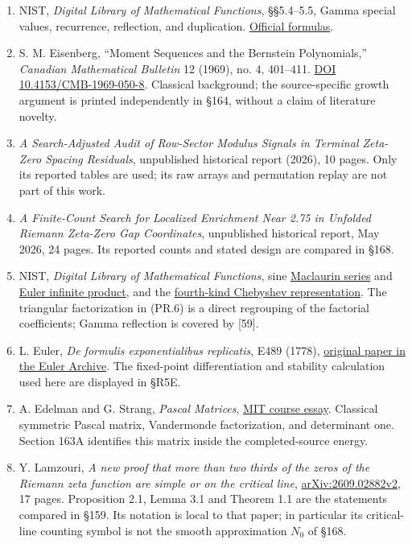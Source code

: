 \documentclass[
  11pt,
]{book}
\begin{document}
\begin{enumerate}
  765--773, \href{https://doi.org/10.2307/2153215}{DOI 10.2307/2153215}.
\item
  NIST, \emph{Digital Library of Mathematical Functions}, §§5.4--5.5,
  Gamma special values, recurrence, reflection, and duplication.
  \href{https://dlmf.nist.gov/5.5}{Official formulas}.
\item
  S. M. Eisenberg, ``Moment Sequences and the Bernstein Polynomials,''
  \emph{Canadian Mathematical Bulletin} 12 (1969), no. 4, 401--411.
  \href{https://doi.org/10.4153/CMB-1969-050-8}{DOI
  10.4153/CMB-1969-050-8}. Classical background; the source-specific
  growth argument is printed independently in §164, without a claim of
  literature novelty.
\item
  \emph{A Search-Adjusted Audit of Row-Sector Modulus Signals in
  Terminal Zeta-Zero Spacing Residuals}, unpublished historical report
  (2026), 10 pages. Only its reported tables are used; its raw arrays
  and permutation replay are not part of this work.
\item
  \emph{A Finite-Count Search for Localized Enrichment Near 2.75 in
  Unfolded Riemann Zeta-Zero Gap Coordinates}, unpublished historical
  report, May 2026, 24 pages. Its reported counts and stated design are
  compared in §168.
\item
  NIST, \emph{Digital Library of Mathematical Functions}, sine
  \href{https://dlmf.nist.gov/4.19.E1}{Maclaurin series} and
  \href{https://dlmf.nist.gov/4.22.E1}{Euler infinite product}, and the
  \href{https://dlmf.nist.gov/18.5.E4}{fourth-kind Chebyshev
  representation}. The triangular factorization in (PR.6) is a direct
  regrouping of the factorial coefficients; Gamma reflection is covered
  by {[}59{]}.
\item
  L. Euler, \emph{De formulis exponentialibus replicatis}, E489 (1778),
  \href{https://scholarlycommons.pacific.edu/euler-works/489/}{original
  paper in the Euler Archive}. The fixed-point differentiation and
  stability calculation used here are displayed in §R5E.
\item
  A. Edelman and G. Strang, \emph{Pascal Matrices},
  \href{https://web.mit.edu/18.06/www/Essays/pascal-work.pdf}{MIT course
  essay}. Classical symmetric Pascal matrix, Vandermonde factorization,
  and determinant one. Section 163A identifies this matrix inside the
  completed-source energy.
\item
  Y. Lamzouri, \emph{A new proof that more than two thirds of the zeros
  of the Riemann zeta function are simple or on the critical line},
  \href{https://arxiv.org/abs/2609.02882}{arXiv:2609.02882v2}, 17 pages.
  Proposition 2.1, Lemma 3.1 and Theorem 1.1 are the statements compared
  in §159. Its notation is local to that paper; in particular its
  critical-line counting symbol is not the smooth approximation \(N_0\)
  of §168.
\end{enumerate}
\end{document}

